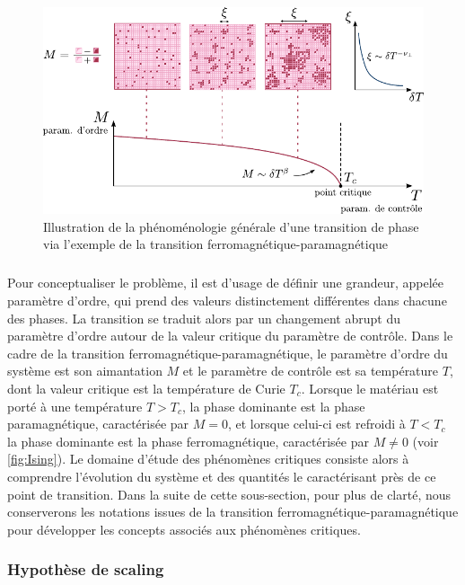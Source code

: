 \begin{figure}[h]
	\centering
	\includegraphics[width=\textwidth]{Chapitre1/Figures/PhenomenesCritiques/PT_conceptCorrLength_fuse.pdf}
	\caption{Illustration de la phénoménologie générale d'une transition de phase via l'exemple de la transition ferromagnétique-paramagnétique}
	\label{fig:Ising}
\end{figure}

\subparagraph{}Pour conceptualiser le problème, il est d'usage de définir une grandeur, appelée paramètre d'ordre, qui prend des valeurs distinctement différentes dans chacune des phases. La transition se traduit alors par un changement abrupt du paramètre d'ordre autour de la valeur critique du paramètre de contrôle. Dans le cadre de la transition ferromagnétique-paramagnétique, le paramètre d'ordre du système est son aimantation $M$ et le paramètre de contrôle est sa température $T$, dont la valeur critique est la température de Curie $T_c$. Lorsque le matériau est porté à une température $T>T_c$, la phase dominante est la phase paramagnétique, caractérisée par $M=0$, et lorsque celui-ci est refroidi à $T<T_c$ la phase dominante est la phase ferromagnétique, caractérisée par $M\neq 0$ (voir \autoref{fig:Ising}). Le domaine d'étude des phénomènes critiques consiste alors à comprendre l'évolution du système et des quantités le caractérisant près de ce point de transition. Dans la suite de cette sous-section, pour plus de clarté, nous conserverons les notations issues de la transition ferromagnétique-paramagnétique pour développer les concepts associés aux phénomènes critiques.

\subsubsection{Hypothèse de scaling}

